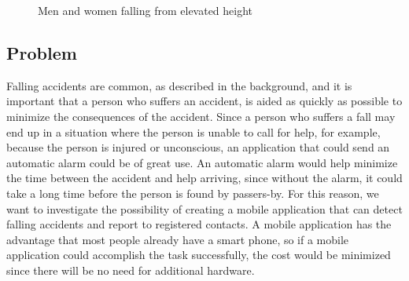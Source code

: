 \documentclass[12pt, a4paper, onecolumn]{article}
\begin{document}
	\begin{figure}[h]
		\centering
		\qquad
		\caption{Men and women falling from elevated height}%
		\label{fig:example}%
	\end{figure}
	
	\subsection{Problem}
	
	Falling accidents are common, as described in the background, and it is important that a person who suffers an accident, is aided as quickly as possible to minimize the consequences of the accident. Since a person who suffers a fall may end up in a situation where the person is unable to call for help, for example, because the person is injured or unconscious, an application that could send an automatic alarm could be of great use. An automatic alarm would help minimize the time between the accident and help arriving, since without the alarm, it could take a long time before the person is found by passers-by. For this reason, we want to investigate the possibility of creating a mobile application that can detect falling accidents and report to registered contacts. A mobile application has the advantage that most people already have a smart phone, so if a mobile application could accomplish the task successfully, the cost would be minimized since there will be no need for additional hardware.
	
\end{document}
